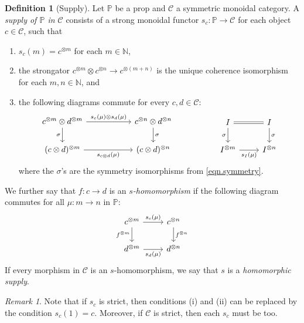 \documentclass[11pt, oneside, article]{memoir}
\theoremstyle{plain}
\theoremstyle{definition}
\newtheorem{definition}[theorem]{Definition}
\theoremstyle{remark}
\newtheorem{remark}[theorem]{Remark}
\newcommand{\cat}[1]{\mathcal{#1}}%
\newcommand{\tpow}[1]{^{\otimes #1}}
\newcommand{\nn}{\mathbb{N}}
\newcommand{\pp}{\mathbb{P}}
\begin{document}
\begin{definition}[Supply]\label{def.supply}
Let $\pp$ be a prop and $\cat{C}$ a symmetric monoidal category. A \emph{supply of $\pp$ in $\cat{C}$} consists of a strong monoidal functor $s_c\colon\pp\to\cat{C}$ for each object $c\in\cat{C}$, such that
\begin{enumerate}[label=(\roman*)]
	\item $s_c(m)=c\tpow{m}$ for each $m\in\nn$, 
	\item the strongator $c\tpow{m}\otimes c\tpow{n}\to c\tpow{(m+n)}$ is the unique coherence isomorphism for each $m,n\in\nn$, and
	\item the following diagrams commute for every $c,d\in\cat{C}$:
\begin{equation}\label{eqn.supply_commute_tensors}
\begin{tikzcd}[column sep=55pt]
	c\tpow{m}\otimes d\tpow{m}\ar[r, "s_c(\mu)\otimes s_d(\mu)"]\ar[d, "\sigma"']&
	c\tpow{n}\otimes d\tpow{n}\ar[d, "\sigma"]\\
	(c\otimes d)\tpow{m}\ar[r, "s_{c\otimes d}(\mu)"']&
	(c\otimes d)\tpow{n}
\end{tikzcd}
\hspace{.7in}
\begin{tikzcd}
	I\ar[r, equal]\ar[d, "\sigma"']&
	I\ar[d, "\sigma"]\\
	I\tpow{m}\ar[r, "s_I(\mu)"']&
	I\tpow{n}
\end{tikzcd}
\end{equation}
where the $\sigma$'s are the symmetry isomorphisms from \cref{eqn.symmetry}.
\end{enumerate}
We further say that $f\colon c\to d$ is an \emph{$s$-homomorphism} if the following diagram commutes for all $\mu\colon m\to n$ in $\pp$:
\begin{equation}\label{eqn.nat_means_homo}
\begin{tikzcd}
	c\tpow{m}\ar[r, "s_c(\mu)"]\ar[d, "f\tpow{m}"']&
	c\tpow{n}\ar[d, "f\tpow{n}"]\\
	d\tpow{m}\ar[r, "s_d(\mu)"']&
	d\tpow{n}
\end{tikzcd}
\end{equation}
If every morphism in $\cat{C}$ is an $s$-homomorphism, we say that $s$ is a \emph{homomorphic supply}.
\end{definition}

\begin{remark}\label{rem.strict}
Note that if $s_c$ is strict, then conditions (i) and (ii) can be replaced by the condition $s_c(1)=c$. Moreover, if $\cat{C}$ is strict, then each $s_c$ must be too.
\end{remark}
\end{document}
